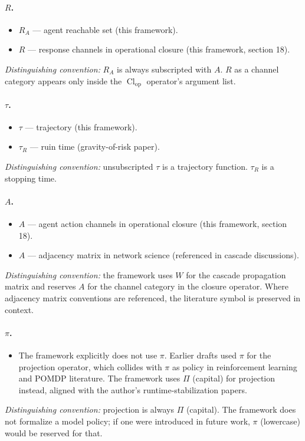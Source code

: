 \documentclass[11pt]{article}
\DeclareMathOperator{\Cl}{Cl}
\begin{document}
\paragraph{$R$.}
\begin{itemize}
\item $R_A$ --- agent reachable set (this framework).
\item $R$ --- response channels in operational closure (this framework, section 18).
\end{itemize}
\textit{Distinguishing convention:} $R_A$ is always subscripted with $A$. $R$ as a channel category appears only inside the $\Cl_{\text{op}}$ operator's argument list.

\paragraph{$\tau$.}
\begin{itemize}
\item $\tau$ --- trajectory (this framework).
\item $\tau_R$ --- ruin time (gravity-of-risk paper).
\end{itemize}
\textit{Distinguishing convention:} unsubscripted $\tau$ is a trajectory function. $\tau_R$ is a stopping time.

\paragraph{$A$.}
\begin{itemize}
\item $A$ --- agent action channels in operational closure (this framework, section 18).
\item $A$ --- adjacency matrix in network science (referenced in cascade discussions).
\end{itemize}
\textit{Distinguishing convention:} the framework uses $W$ for the cascade propagation matrix and reserves $A$ for the channel category in the closure operator. Where adjacency matrix conventions are referenced, the literature symbol is preserved in context.

\paragraph{$\pi$.}
\begin{itemize}
\item The framework explicitly does not use $\pi$. Earlier drafts used $\pi$ for the projection operator, which collides with $\pi$ as policy in reinforcement learning and POMDP literature. The framework uses $\Pi$ (capital) for projection instead, aligned with the author's runtime-stabilization papers.
\end{itemize}
\textit{Distinguishing convention:} projection is always $\Pi$ (capital). The framework does not formalize a model policy; if one were introduced in future work, $\pi$ (lowercase) would be reserved for that.
\end{document}
